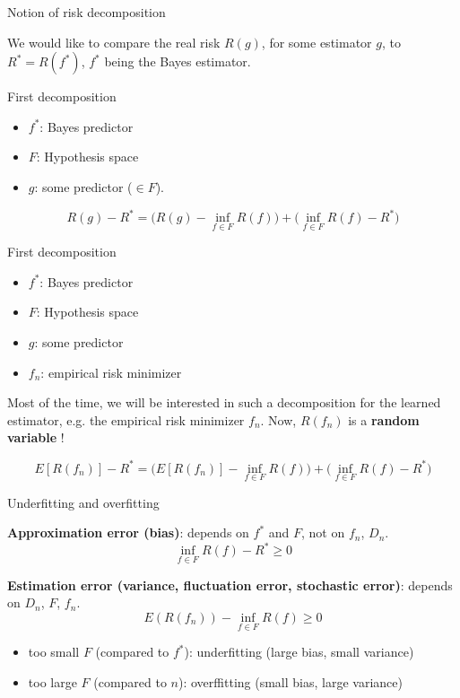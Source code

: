 \documentclass[usenames,dvipsnames]{beamer}
\begin{document}
\begin{frame}{Notion of risk decomposition}

    We would like to compare the real risk $R(g)$, for some estimator $g$, to $R^*=R(f^*)$, $f^*$ being the Bayes estimator.

\end{frame}

\begin{frame}{First decomposition}
\begin{itemize}
    \item $f^*$: Bayes predictor
    \item $F$: Hypothesis space
    \item $g$: some predictor ($\in F$).
\end{itemize}

\begin{equation}
    R(g)-R^* = \Big(R(g)- \inf_{f\in F}R(f)\Big) +\Big(\inf_{f\in F}R(f)-R^* \Big)
\end{equation}
\end{frame}

\begin{frame}{First decomposition}
\begin{itemize}
    \item $f^*$: Bayes predictor
    \item $F$: Hypothesis space
    \item $g$: some predictor
	\item $f_n$: empirical risk minimizer
\end{itemize}

    Most of the time, we will be interested in such a decomposition for the learned estimator, e.g. the empirical risk minimizer $f_n$. Now, $R(f_n)$ is a \textbf{random variable} !

\begin{equation}
    E[R(f_n)]-R^* = \Big(E[R(f_n)]- \inf_{f\in F}R(f)\Big) +\Big(\inf_{f\in F}R(f)-R^* \Big)
\end{equation}
\end{frame}

\begin{frame}{Underfitting and overfitting}

\textbf{{Approximation error (bias)}}: depends on $f^*$ and $F$, not on $ f_n$, $D_n$.
	\begin{equation*}
	    \inf_{f\in F}R(f)-R^*\geq 0
	\end{equation*}

\textbf{{Estimation error (variance, fluctuation error, stochastic error)}}: depends on $D_n$, $F$, $ f_n$. 
	\begin{equation*}
	    E(R( f_n))- \inf_{f\in F}R(f)\geq 0
	\end{equation*}

	\begin{itemize}
	    \item too small $F$ (compared to $f^*$): underfitting (large bias, small variance)
	    \item too large $F$ (compared to $n$): overffitting (small bias, large variance)
	\end{itemize}
\end{frame}
\end{document}
